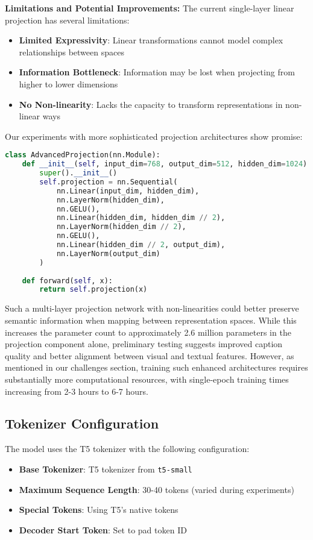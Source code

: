 \documentclass[12pt,a4paper]{report}
\begin{document}
\textbf{Limitations and Potential Improvements:}
The current single-layer linear projection has several limitations:
\begin{itemize}
    \item \textbf{Limited Expressivity}: Linear transformations cannot model complex relationships between spaces
    \item \textbf{Information Bottleneck}: Information may be lost when projecting from higher to lower dimensions
    \item \textbf{No Non-linearity}: Lacks the capacity to transform representations in non-linear ways
\end{itemize}

Our experiments with more sophisticated projection architectures show promise:
\begin{lstlisting}[language=python, caption=Multi-Layer Projection Network]
class AdvancedProjection(nn.Module):
    def __init__(self, input_dim=768, output_dim=512, hidden_dim=1024):
        super().__init__()
        self.projection = nn.Sequential(
            nn.Linear(input_dim, hidden_dim),
            nn.LayerNorm(hidden_dim),
            nn.GELU(),
            nn.Linear(hidden_dim, hidden_dim // 2),
            nn.LayerNorm(hidden_dim // 2),
            nn.GELU(),
            nn.Linear(hidden_dim // 2, output_dim),
            nn.LayerNorm(output_dim)
        )
    
    def forward(self, x):
        return self.projection(x)
\end{lstlisting}

Such a multi-layer projection network with non-linearities could better preserve semantic information when mapping between representation spaces. While this increases the parameter count to approximately 2.6 million parameters in the projection component alone, preliminary testing suggests improved caption quality and better alignment between visual and textual features. However, as mentioned in our challenges section, training such enhanced architectures requires substantially more computational resources, with single-epoch training times increasing from 2-3 hours to 6-7 hours.

\subsection{Tokenizer Configuration}
The model uses the T5 tokenizer with the following configuration:
\begin{itemize}
    \item \textbf{Base Tokenizer}: T5 tokenizer from \texttt{t5-small}
    \item \textbf{Maximum Sequence Length}: 30-40 tokens (varied during experiments)
    \item \textbf{Special Tokens}: Using T5's native tokens
    \item \textbf{Decoder Start Token}: Set to pad token ID
\end{itemize}
\end{document}
